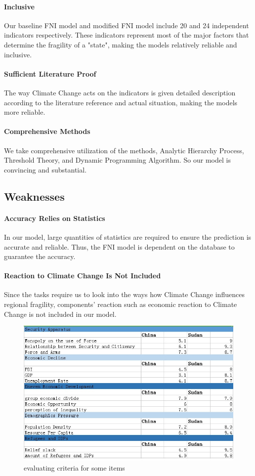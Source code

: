 \documentclass[a4paper,12pt]{article}
\begin{document}
\paragraph{Inclusive} Our baseline FNI model and modified FNI model include 20 and 24 independent indicators respectively. These indicators represent most of the major factors that determine the fragility of a "state", making the models relatively reliable and inclusive.
\paragraph{Sufficient Literature Proof} The way Climate Change acts on the indicators is given detailed description according to the literature reference and actual situation, making the models more reliable.
\paragraph{Comprehensive Methods} We take comprehensive utilization of the methods, Analytic Hierarchy Process, Threshold Theory, and Dynamic Programming Algorithm. So our model is convincing and substantial.
\subsection{Weaknesses}
\paragraph{Accuracy Relies on Statistics} In our model, large quantities of statistics are required to ensure the prediction is accurate and reliable. Thus, the FNI model is dependent on the database to guarantee the accuracy.
\paragraph{Reaction to Climate Change Is Not Included} Since the tasks require us to look into the ways how Climate Change influences regional fragility, components' reaction such as economic reaction to Climate Change is not included in our model.




\appendix
\appendixpage
\begin{figure} [H]
\centering
\includegraphics[width=\textwidth]{output3.jpg}
\caption{evaluating criteria for some items}
\end{figure}
\end{document}
